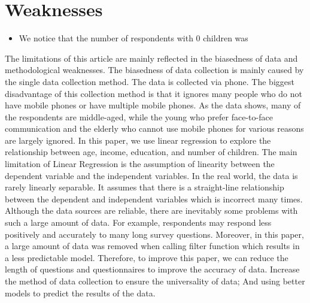 \documentclass[
]{article}
\providecommand{\tightlist}{%
  \setlength{\itemsep}{0pt}\setlength{\parskip}{0pt}}
\begin{document}
\hypertarget{weaknesses}{%
\section{Weaknesses}\label{weaknesses}}

\begin{itemize}
\tightlist
\item
  We notice that the number of respondents with 0 children was
\end{itemize}

The limitations of this article are mainly reflected in the biasedness
of data and methodological weaknesses. The biasedness of data collection
is mainly caused by the single data collection method. The data is
collected via phone. The biggest disadvantage of this collection method
is that it ignores many people who do not have mobile phones or have
multiple mobile phones. As the data shows, many of the respondents are
middle-aged, while the young who prefer face-to-face communication and
the elderly who cannot use mobile phones for various reasons are largely
ignored. In this paper, we use linear regression to explore the
relationship between age, income, education, and number of children. The
main limitation of Linear Regression is the assumption of linearity
between the dependent variable and the independent variables. In the
real world, the data is rarely linearly separable. It assumes that there
is a straight-line relationship between the dependent and independent
variables which is incorrect many times. Although the data sources are
reliable, there are inevitably some problems with such a large amount of
data. For example, respondents may respond less positively and
accurately to many long survey questions. Moreover, in this paper, a
large amount of data was removed when calling filter function which
results in a less predictable model. Therefore, to improve this paper,
we can reduce the length of questions and questionnaires to improve the
accuracy of data. Increase the method of data collection to ensure the
universality of data; And using better models to predict the results of
the data.
\end{document}
